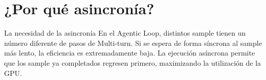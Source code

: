 \section{¿Por qué asincronía?}
\begin{importantbox}{La necesidad de la asincronía}
En el Agentic Loop, distintos sample tienen un número diferente de pasos de Multi-turn. Si se espera de forma síncrona al sample más lento, la eficiencia es extremadamente baja. La ejecución asíncrona permite que los sample ya completados regresen primero, maximizando la utilización de la GPU.
\end{importantbox}

